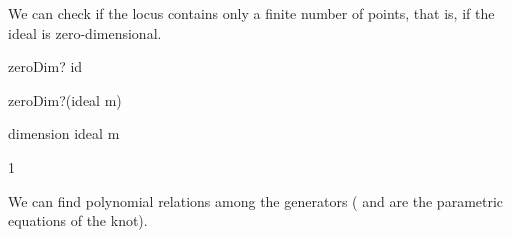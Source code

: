 {{{{{{{{{{{{{{{{{{\begin{xtc}
\begin{TeXOutput}
\begin{fricasmath}{4}
%
\end{fricasmath}
\end{TeXOutput}
\end{xtc}
%
%
\begin{xtc}
\begin{xtccomment}
We can check if the locus contains only a finite number of points,
that is, if the ideal is zero-dimensional.
\end{xtccomment}
\begin{spadsrc}
zeroDim? id 
\end{spadsrc}
\begin{TeXOutput}
\begin{fricasmath}{5}
%
\end{fricasmath}
\end{TeXOutput}
\end{xtc}
\begin{xtc}
\begin{xtccomment}
\end{xtccomment}
\begin{spadsrc}
zeroDim?(ideal m) 
\end{spadsrc}
\begin{TeXOutput}
\begin{fricasmath}{6}
%
\end{fricasmath}
\end{TeXOutput}
\end{xtc}
\begin{xtc}
\begin{xtccomment}
\end{xtccomment}
\begin{spadsrc}
dimension ideal m 
\end{spadsrc}
\begin{TeXOutput}
\begin{fricasmath}{7}
1%
\end{fricasmath}
\end{TeXOutput}
\end{xtc}
\begin{xtc}
\begin{xtccomment}
We can find polynomial relations among the generators
( and  are the parametric equations of the knot).

\end{xtccomment}
\end{xtc}}}}}}}}}}}}}}}}}}}
